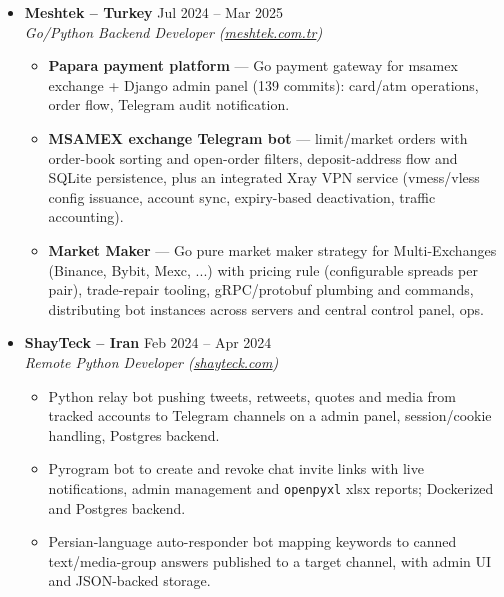 \documentclass[12pt,a4paper]{article}
\begin{document}
\begin{itemize}[label=\tiny$\bullet$, leftmargin=1em, itemsep=6pt]
        \item \textbf{Meshtek -- Turkey} \hfill {\color{textgrey} Jul 2024 -- Mar 2025} \\
        \textit{Go/Python Backend Developer (\href{https://meshtek.com.tr}{meshtek.com.tr})}
        \begin{itemize}[label=--, topsep=1pt]
            \item \textbf{Papara payment platform} --- Go payment gateway for msamex exchange + Django admin
                panel (139 commits): card/atm operations, order flow, Telegram audit
                notification.
            \item \textbf{MSAMEX exchange Telegram bot} --- limit/market
                orders with order-book sorting and open-order filters, deposit-address flow and
                SQLite persistence, plus an integrated Xray VPN service (vmess/vless config
                issuance, account sync, expiry-based deactivation, traffic
                accounting).
            \item \textbf{Market Maker} --- Go pure market maker strategy for
                Multi-Exchanges (Binance, Bybit, Mexc, ...) with pricing rule (configurable spreads per
                pair), trade-repair tooling, gRPC/protobuf plumbing and
                commands, distributing bot instances across servers and central control panel,
                ops.
        \end{itemize}

        \item \textbf{ShayTeck -- Iran} \hfill {\color{textgrey} Feb 2024 -- Apr 2024} \\
        \textit{Remote Python Developer (\href{https://shayteck.com}{shayteck.com})}
        \begin{itemize}[label=--, topsep=1pt]
            \item Python relay bot pushing tweets,
                retweets, quotes and media from tracked accounts to Telegram channels on a
                admin panel, session/cookie handling, Postgres backend.
            \item Pyrogram bot to create
                and revoke chat invite links with live notifications, admin management and
                \texttt{openpyxl} xlsx reports; Dockerized and Postgres backend.
            \item Persian-language auto-responder bot mapping
                keywords to canned text/media-group answers published to a target channel,
                with admin UI and JSON-backed storage.
        \end{itemize}


\end{itemize}
\end{document}
